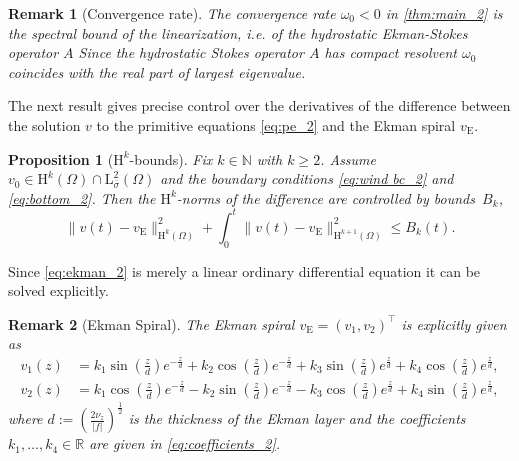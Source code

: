 \documentclass[preprint]{elsarticle}
\newtheorem{prop}[prop]{Proposition}
\newtheorem{rem}[rem]{Remark}
\numberwithin{equation}{section}
\newcommand {\N}	{\mathbb{N}}
\newcommand {\R}	{\mathbb{R}}
\renewcommand{\H}{\mathrm{H}}
\renewcommand{\bar}[1]{\overline{#1}}
\newcommand{\rL}{\mathrm{L}}
\newcommand{\rH}{\H}
\newcommand{\rE}{\mathrm{E}}
\begin{document}
\begin{rem}[Convergence rate]
	The convergence rate $\omega_0<0$ in \autoref{thm:main_2} is the spectral bound of the linearization, i.e. of the hydrostatic Ekman-Stokes operator $A$ %
	Since the hydrostatic Stokes operator $A$ has compact resolvent $\omega_0$ coincides with the real part of largest eigenvalue.  
\end{rem}

The next result gives precise control over the derivatives of the difference between the solution $v$ to the primitive equations \eqref{eq:pe_2} and the Ekman spiral $v_{\rE}$. 

\begin{prop}[$\rH^k$-bounds]\label{prop:Hk_2}
	Fix $k \in \N$ with $k \geq 2$. Assume $v_0 \in \rH^k(\Omega) \cap \rL^2_{\bar{\sigma}}(\Omega)$ and the boundary conditions \eqref{eq:wind bc_2} and \eqref{eq:bottom_2}.
	Then the $\rH^k$-norms of the difference are controlled by bounds~$B_k$,
	\begin{equation*}
		\| v(t) - v_{\rE} \|_{\rH^{k}(\Omega)}^2
		+ \int_0^t \| v(t) - v_{\rE} \|_{\rH^{k+1}(\Omega)}^2
		\leq B_k(t) .
	\end{equation*} 
\end{prop}

Since \eqref{eq:ekman_2} is merely a linear ordinary differential equation it can be solved explicitly.

\begin{rem}[Ekman Spiral]\label{rem:ekman_2}
	The Ekman spiral $v_{\rE} = (v_1,v_2)^\top$ is explicitly given as
	\begin{align*}
		v_1(z)
		&= k_1 \sin(\tfrac{z}{d}) e^{-\tfrac{z}{d}}
		+ k_2 \cos(\tfrac{z}{d}) e^{-\tfrac{z}{d}}
		+ k_3 \sin(\tfrac{z}{d}) e^{\tfrac{z}{d}}
		+ k_4 \cos(\tfrac{z}{d}) e^{\tfrac{z}{d}}, \\
		v_2(z)
		&=
		k_1 \cos (\tfrac{z}{d}) e^{-\tfrac{z}{d}}
		- k_2 \sin (\tfrac{z}{d}) e^{-\tfrac{z}{d}}
		- k_3 \cos (\tfrac{z}{d}) e^{\tfrac{z}{d}}
		+ k_4 \sin (\tfrac{z}{d}) e^{\tfrac{z}{d}},
	\end{align*}
	where $d := (\frac{2 \nu_z}{|f|})^{\frac{1}{2}}$ is the thickness of the Ekman layer and 
	the coefficients $k_1,\dots,k_4  \in \R$ are given in \eqref{eq:coefficients_2}.
\end{rem}
\end{document}
